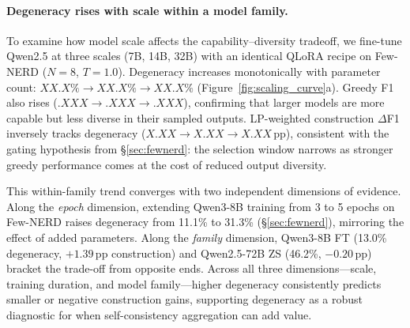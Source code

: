 
\newcommand{\scaleSevenDegen}{XX.X}    %
\newcommand{\scaleFourteenDegen}{XX.X} %
\newcommand{\scaleThirtytwoDegen}{XX.X}%
\newcommand{\scaleSevenGreedy}{.XXX}   %
\newcommand{\scaleFourteenGreedy}{.XXX}%
\newcommand{\scaleThirtytwoGreedy}{.XXX}%
\newcommand{\scaleSevenConstr}{X.XX}   %
\newcommand{\scaleFourteenConstr}{X.XX}%
\newcommand{\scaleThirtytwoConstr}{X.XX}%
\newcommand{\scaleSevenLP}{.XXX}       %
\newcommand{\scaleFourteenLP}{.XXX}    %
\newcommand{\scaleThirtytwoLP}{.XXX}   %


\paragraph{Degeneracy rises with scale within a model family.}
To examine how model scale affects the capability--diversity tradeoff, we fine-tune Qwen2.5 at three scales (7B, 14B, 32B) with an identical QLoRA recipe on Few-NERD ($N{=}8$, $T{=}1.0$).
Degeneracy increases monotonically with parameter count: $\scaleSevenDegen\%\to\scaleFourteenDegen\%\to\scaleThirtytwoDegen\%$ (Figure~\ref{fig:scaling_curve}a).
Greedy F1 also rises ($\scaleSevenGreedy\to\scaleFourteenGreedy\to\scaleThirtytwoGreedy$), confirming that larger models are more capable but less diverse in their sampled outputs.
LP-weighted construction $\Delta$F1 inversely tracks degeneracy ($\scaleSevenConstr\to\scaleFourteenConstr\to\scaleThirtytwoConstr$\,pp), consistent with the gating hypothesis from \S\ref{sec:fewnerd}: the selection window narrows as stronger greedy performance comes at the cost of reduced output diversity.

This within-family trend converges with two independent dimensions of evidence.
Along the \emph{epoch} dimension, extending Qwen3-8B training from 3 to 5 epochs on Few-NERD raises degeneracy from 11.1\% to 31.3\% (\S\ref{sec:fewnerd}), mirroring the effect of added parameters.
Along the \emph{family} dimension, Qwen3-8B FT (13.0\% degeneracy, $+1.39$\,pp construction) and Qwen2.5-72B ZS (46.2\%, $-0.20$\,pp) bracket the trade-off from opposite ends.
Across all three dimensions---scale, training duration, and model family---higher degeneracy consistently predicts smaller or negative construction gains, supporting degeneracy as a robust diagnostic for when self-consistency aggregation can add value.
